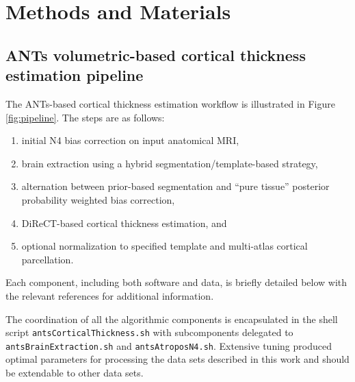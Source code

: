 \section{Methods and Materials}

\subsection{ANTs volumetric-based cortical thickness estimation pipeline}

The ANTs-based cortical thickness estimation workflow is illustrated 
in Figure \ref{fig:pipeline}.  The steps are as follows:
\begin{enumerate}
  \item initial N4 bias correction on input anatomical MRI,
  \item brain extraction using a hybrid segmentation/template-based strategy,
  \item alternation between prior-based segmentation and ``pure tissue'' 
        posterior probability weighted bias correction,
  \item DiReCT-based cortical thickness estimation, and
  \item optional normalization to specified template and multi-atlas
    cortical parcellation. 
\end{enumerate}
Each component, including both software and data, is briefly detailed 
below with the relevant references for additional information. 

The coordination of all the algorithmic components is
encapsulated in the shell script \verb#antsCorticalThickness.sh# with
subcomponents delegated to \verb#antsBrainExtraction.sh# 
and \verb#antsAtroposN4.sh#.  Extensive tuning produced
optimal parameters for processing the data sets
described in this work and should be extendable to 
other data sets.


